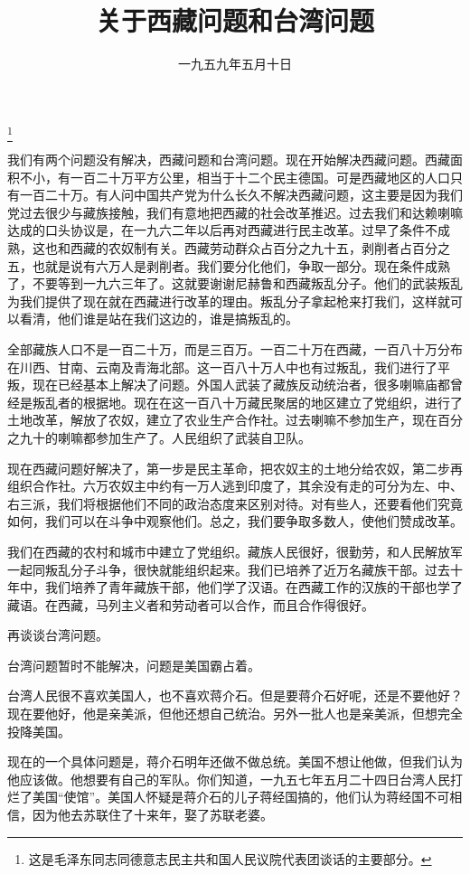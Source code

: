 
\title{关于西藏问题和台湾问题}
\date{一九五九年五月十日}
\thanks{这是毛泽东同志同德意志民主共和国人民议院代表团谈话的主要部分。}
\maketitle


我们有两个问题没有解决，西藏问题和台湾问题。现在开始解决西藏问题。西藏面积不小，有一百二十万平方公里，相当于十二个民主德国。可是西藏地区的人口只有一百二十万。有人问中国共产党为什么长久不解决西藏问题，这主要是因为我们党过去很少与藏族接触，我们有意地把西藏的社会改革推迟。过去我们和达赖喇嘛达成的口头协议是，在一九六二年以后再对西藏进行民主改革。过早了条件不成熟，这也和西藏的农奴制有关。西藏劳动群众占百分之九十五，剥削者占百分之五，也就是说有六万人是剥削者。我们要分化他们，争取一部分。现在条件成熟了，不要等到一九六三年了。这就要谢谢尼赫鲁和西藏叛乱分子。他们的武装叛乱为我们提供了现在就在西藏进行改革的理由。叛乱分子拿起枪来打我们，这样就可以看清，他们谁是站在我们这边的，谁是搞叛乱的。

全部藏族人口不是一百二十万，而是三百万。一百二十万在西藏，一百八十万分布在川西、甘南、云南及青海北部。这一百八十万人中也有过叛乱，我们进行了平叛，现在已经基本上解决了问题。外国人武装了藏族反动统治者，很多喇嘛庙都曾经是叛乱者的根据地。现在在这一百八十万藏民聚居的地区建立了党组织，进行了土地改革，解放了农奴，建立了农业生产合作社。过去喇嘛不参加生产，现在百分之九十的喇嘛都参加生产了。人民组织了武装自卫队。

现在西藏问题好解决了，第一步是民主革命，把农奴主的土地分给农奴，第二步再组织合作社。六万农奴主中约有一万人逃到印度了，其余没有走的可分为左、中、右三派，我们将根据他们不同的政治态度来区别对待。对有些人，还要看他们究竟如何，我们可以在斗争中观察他们。总之，我们要争取多数人，使他们赞成改革。

我们在西藏的农村和城市中建立了党组织。藏族人民很好，很勤劳，和人民解放军一起同叛乱分子斗争，很快就能组织起来。我们已培养了近万名藏族干部。过去十年中，我们培养了青年藏族干部，他们学了汉语。在西藏工作的汉族的干部也学了藏语。在西藏，马列主义者和劳动者可以合作，而且合作得很好。

再谈谈台湾问题。

台湾问题暂时不能解决，问题是美国霸占着。

台湾人民很不喜欢美国人，也不喜欢蒋介石。但是要蒋介石好呢，还是不要他好？现在要他好，他是亲美派，但他还想自己统治。另外一批人也是亲美派，但想完全投降美国。

现在的一个具体问题是，蒋介石明年还做不做总统。美国不想让他做，但我们认为他应该做。他想要有自己的军队。你们知道，一九五七年五月二十四日台湾人民打烂了美国“使馆”。美国人怀疑是蒋介石的儿子蒋经国搞的，他们认为蒋经国不可相信，因为他去苏联住了十来年，娶了苏联老婆。

